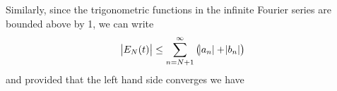 \documentclass[../Main/thesis.tex]{subfiles}
\begin{document}
Similarly, since the trigonometric functions in the infinite Fourier series are bounded above by 1, we can write 
\begin{equation}
\abs{E_{N}(t)} \leq \sum_{n = N+1}^{\infty} \left(\abs{a_{n}} + \abs{b_{n}}\right)
\end{equation} 
and provided that the left hand side converges we have 
%
%
\end{document}
